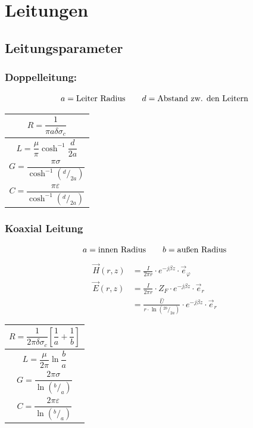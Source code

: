 \section{Leitungen}

\subsection{Leitungsparameter}

\subsubsection{Doppelleitung:}
\[
    a = \text{Leiter Radius} \qquad d = \text{Abstand zw. den Leitern} \\
\]


{\renewcommand*{\arraystretch}{0.2}
    \begin{tabularx}{0.5\columnwidth}{|X|}
        \hline
        \[R  = \frac{1}{\pi a\delta\sigma_c}\]              \\
        \hline
        \[L = \frac{\mu}{\pi} \cosh^{-1}\frac{d}{2a}\]      \\
        \hline
        \[G = \frac{\pi\sigma}{\cosh^{-1}(^d/_{2a})}\]      \\
        \hline
        \[C = \frac{\pi\varepsilon}{\cosh^{-1}(^d/_{2a})}\] \\
        \hline
    \end{tabularx}}

\subsubsection{Koaxial Leitung}
\[
    a = \text{innen Radius} \qquad b = \text{außen Radius} \\
\]
\begin{align*}
    \vec{H}(r, z) & = \frac{I}{2\pi r}\cdot e^{-j\beta z}\cdot\vec{e}_\varphi                    \\
    \vec{E}(r, z) & = \frac{I}{2\pi r}\cdot Z_F\cdot e^{-j\beta z} \cdot\vec{e}_r                \\
                  & = \frac{\hat{U}}{r \cdot\ln{(^{2b}/_{2a})}}\cdot e^{-j\beta z}\cdot\vec{e}_r
\end{align*}


{\renewcommand*{\arraystretch}{0.2}
    \begin{tabularx}{0.5\columnwidth}{|X|}
        \hline
        \[R=\frac{1}{2\pi\delta\sigma_c}\left[\frac{1}{a}+\frac{1}{b}\right]\] \\
        \hline
        \[L=\frac{\mu}{2\pi}\ln\frac{b}{a}\]                                   \\
        \hline
        \[G=\frac{2\pi\sigma}{\ln(^b/_a)}\]                                    \\
        \hline
        \[C=\frac{2\pi\varepsilon}{\ln(^b/_a)}\]                               \\
        \hline
    \end{tabularx}}

